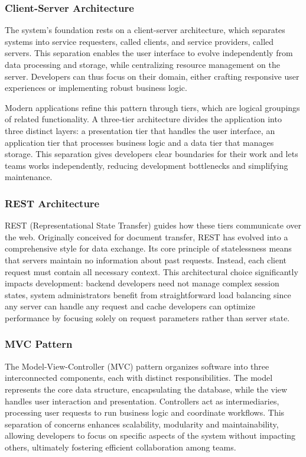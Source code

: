 \subsubsection{Client-Server Architecture}
The system's foundation rests on a client-server architecture, which separates systems into service requesters, called clients, and service providers, called servers.
This separation enables the user interface to evolve independently from data processing and storage, while centralizing resource management on the server.
Developers can thus focus on their domain, either crafting responsive user experiences or implementing robust business logic.

Modern applications refine this pattern through tiers, which are logical groupings of related functionality.
A three-tier architecture divides the application into three distinct layers: a presentation tier that handles the user interface, an application tier that processes business logic and a data tier that manages storage.
This separation gives developers clear boundaries for their work and lets teams works independently, reducing development bottlenecks and simplifying maintenance.

\subsubsection{REST Architecture}
REST (Representational State Transfer) guides how these tiers communicate over the web.
Originally conceived for document transfer, REST has evolved into a comprehensive style for data exchange.
Its core principle of statelessness means that servers maintain no information about past requests.
Instead, each client request must contain all necessary context.
This architectural choice significantly impacts development: backend developers need not manage complex session states, system administrators benefit from straightforward load balancing since any server can handle any request and cache developers can optimize performance by focusing solely on request parameters rather than server state.

\subsubsection{MVC Pattern}
The Model-View-Controller (MVC) pattern organizes software into three interconnected components, each with distinct responsibilities.
The model represents the core data structure, encapsulating the database, while the view handles user interaction and presentation.
Controllers act as intermediaries, processing user requests to run business logic and coordinate workflows.
This separation of concerns enhances scalability, modularity and maintainability, allowing developers to focus on specific aspects of the system without impacting others, ultimately fostering efficient collaboration among teams.

